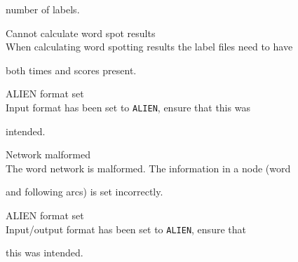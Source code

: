 \begin{itemize}
\begin{itemize}
        number of labels.





 Cannot calculate word spot results\\


        When calculating word spotting results the label files need to have 


        both times and scores present.





    ALIEN format set\\


        Input format has been set to \texttt{ALIEN}, ensure that this was 


        intended.





\end{itemize}










\begin{itemize}


    Network malformed\\


        The word network is malformed. The information in a node (word


        and following arcs) is set incorrectly.





\end{itemize}










\begin{itemize}





    ALIEN format set\\


        Input/output format has been set to \texttt{ALIEN}, ensure that 


        this was intended.






\end{itemize}
\end{itemize}
